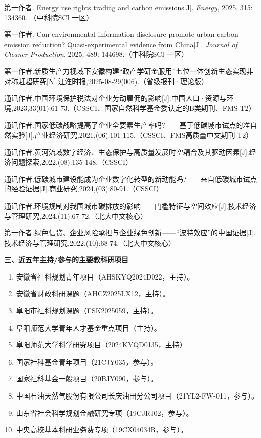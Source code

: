\documentclass[11pt,a4paper]{ctexart}
\newcommand{\cvsection}[1]{%
  \Needspace{7\baselineskip}%
  \vspace{0.70em plus 0.14em minus 0.06em}%
  \noindent\begingroup\color{cvaccent}\sffamily\bfseries\large #1\endgroup\par\vspace{0.12em}%
  \noindent{\color{cvaccent}\rule{1.55cm}{1.15pt}}{\color{cvline}\rule{\dimexpr\linewidth-1.55cm\relax}{0.45pt}}\par
  \vspace{0.30em plus 0.05em minus 0.03em}%
}
\newenvironment{cvpubs}{\begin{enumerate}[label={\color{cvaccent}[\arabic*]},leftmargin=2.55em,labelsep=0.62em,align=left]}{\end{enumerate}}
\newenvironment{cvnums}{\begin{enumerate}[label={\color{cvaccent}\arabic*.},leftmargin=2.20em,labelsep=0.62em,align=left]}{\end{enumerate}}
\begin{document}
\begin{cvpubs}
\item 第一作者. Energy use rights trading and carbon emissions[J]. \textit{Energy}, 2025, 315: 134360. （中科院SCI 一区）
\item 第一作者. Can environmental information disclosure promote urban carbon emission reduction? Quasi-experimental evidence from China[J]. \textit{Journal of Cleaner Production}, 2025, 489: 144698.（中科院SCI 一区）
\item 第一作者.新质生产力视域下安徽构建“政产学研金服用”七位一体创新生态实现非对称赶超研究[N].江淮时报,2025-08-29(006).（省级报刊·理论版）
\item 通讯作者.中国环境保护税法对企业劳动雇佣的影响[J].中国人口·资源与环境,2023,33(01):61-73.（CSSCI、国家自然科学基金委认定的B类期刊、FMS T2）
\item 通讯作者.国家低碳战略提高了企业全要素生产率吗?——基于低碳城市试点的准自然实验[J].产业经济研究,2021,(06):101-115.（CSSCI、FMS高质量中文期刊 T2）
\item 通讯作者.黄河流域数字经济、生态保护与高质量发展时空耦合及其驱动因素[J].经济问题探索,2022,(08):135-148.（CSSCI）
\item 通讯作者.低碳城市建设能成为企业数字化转型的新动能吗?——来自低碳城市试点的经验证据[J].商业研究,2024,(03):80-91.（CSSCI）
\item 通讯作者.环境规制对我国城市碳排放的影响——门槛特征与空间效应[J].技术经济与管理研究,2024,(11):67-72.（北大中文核心）
\item 第一作者.绿色信贷、企业风险承担与企业绿色创新——“波特效应”的中国证据[J].技术经济与管理研究,2022,(10):68-74.（北大中文核心）
\end{cvpubs}

\cvsection{三、近五年主持/参与的主要教科研项目}

\begin{cvnums}
\item 安徽省社科规划青年项目（AHSKYQ2024D022，主持）。
\item 安徽省财政科研课题（AHCZ2025LX12，主持）。
\item 阜阳市社科规划课题（FSK2025059，主持）。
\item 阜阳师范大学青年人才基金重点项目（主持）。
\item 阜阳师范大学科学研究项目（2024KYQD0135，主持）
\item 国家社科基金青年项目（21CJY035，参与）。
\item 国家社科基金一般项目（20BJY090，参与）。
\item 中国石油天然气股份有限公司长庆油田分公司项目（21YL2-FW-011，参与）。
\item 山东省社会科学规划金融研究专项（19CJRJ02，参与）。
\item 中央高校基本科研业务费专项（19CX04034B，参与）。
\end{cvnums}
\end{document}
